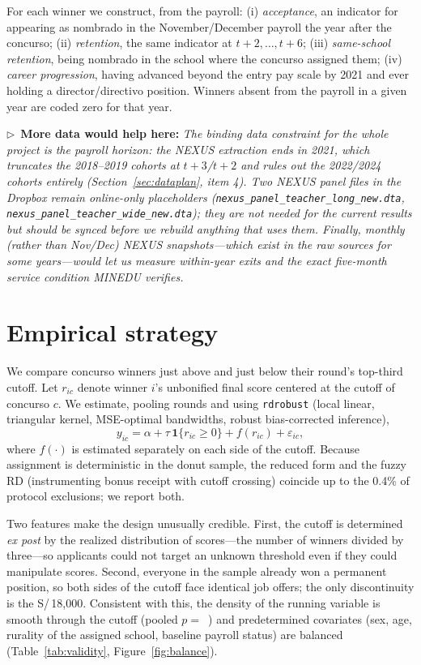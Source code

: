 \documentclass[11pt]{article}
\newcommand{\dataneed}[1]{\par\medskip\noindent\begin{small}\noindent
$\triangleright$~\textbf{More data would help here:} \emph{#1}\end{small}\par\medskip}
\begin{document}
For each winner we construct, from the payroll: (i) \emph{acceptance},
an indicator for appearing as nombrado in the November/December payroll the
year after the concurso; (ii) \emph{retention}, the same indicator at
$t+2,\dots,t+6$; (iii) \emph{same-school retention}, being nombrado in the
school where the concurso assigned them; (iv) \emph{career progression},
having advanced beyond the entry pay scale by 2021 and ever holding a
director/directivo position. Winners absent from the payroll in a given year
are coded zero for that year.

\dataneed{The binding data constraint for the whole project is the payroll
horizon: the NEXUS extraction ends in 2021, which truncates the 2018--2019
cohorts at $t+3$/$t+2$ and rules out the 2022/2024 cohorts entirely
(Section~\ref{sec:dataplan}, item 4). Two NEXUS panel files in the Dropbox
remain online-only placeholders
(\texttt{nexus\_panel\_teacher\_long\_new.dta},
\texttt{nexus\_panel\_teacher\_wide\_new.dta}); they are not needed for the
current results but should be synced before we rebuild anything that uses
them. Finally, monthly (rather than Nov/Dec) NEXUS snapshots---which exist in
the raw sources for some years---would let us measure within-year exits and
the exact five-month service condition MINEDU verifies.}

\section{Empirical strategy}\label{sec:design}

We compare concurso winners just above and just below their round's top-third
cutoff. Let $r_{ic}$ denote winner $i$'s unbonified final score centered at
the cutoff of concurso $c$. We estimate, pooling rounds and using
\texttt{rdrobust} (local linear, triangular kernel, MSE-optimal bandwidths,
robust bias-corrected inference),
\begin{equation}
y_{ic} = \alpha + \tau\,\mathbf{1}\{r_{ic} \geq 0\} + f(r_{ic}) + \varepsilon_{ic},
\end{equation}
where $f(\cdot)$ is estimated separately on each side of the cutoff. Because
assignment is deterministic in the donut sample, the reduced form and the
fuzzy RD (instrumenting bonus receipt with cutoff crossing) coincide up to the
0.4\% of protocol exclusions; we report both.

Two features make the design unusually credible. First, the cutoff is
determined \emph{ex post} by the realized distribution of scores---the number
of winners divided by three---so applicants could not target an unknown
threshold even if they could manipulate scores. Second, everyone in the sample
already won a permanent position, so both sides of the cutoff face identical
job offers; the only discontinuity is the S/\,18,000. Consistent with this,
the density of the running variable is smooth through the cutoff (pooled
$p=$~\DensityPooledP) and predetermined covariates (sex, age, rurality of the
assigned school, baseline payroll status) are balanced
(Table~\ref{tab:validity}, Figure~\ref{fig:balance}).
\end{document}
